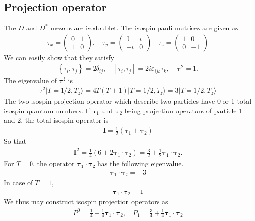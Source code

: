 \documentclass[aps,prd,preprintnumbers,showpacs,showkeys,nofootinbib,
superscriptaddress,fleqn,floatfix,tightenlines, 10pt]{revtex4-1}
\begin{document}
\subsection{Projection operator}
The $D$ and $D^*$ mesons are isodoublet. The isospin pauli matrices are given as
\begin{align}
	\tau_x = \left(\begin{array}{cc}
	0 & 1 \\
	1 & 0
	\end{array} \right), \quad
	\tau_y = \left(\begin{array}{cc}
	0 & i \\
	-i & 0
	\end{array} \right) \quad
	\tau_z = \left(\begin{array}{cc}
	1 & 0 \\
	0 & -1
	\end{array} \right)
\end{align}
We can easily show that they satisfy
\begin{align}
	\left\{ \tau_i,\tau_j \right\} = 2\delta_{ij},\quad
	\left[ \tau_i, \tau_j \right] = 2 i \varepsilon_{ijk} \tau_k,\quad
	\bm{\tau}^2 = 1.
\end{align}
The eigenvalue of $\bm{\tau}^2$ is
\begin{align}
	\tau^2 |T=1/2,T_z\rangle = 4T(T+1)|T=1/2,T_z\rangle = 3|T=1/2,T_z\rangle
\end{align}
The two isospin projection operator which describe two particles have 0 or 1 total isospin quantum numbers.
If $\bm{\tau}_1$ and $\bm{\tau}_2$ being projection operators of particle 1 and 2, the total isospin operator is
\begin{align}
	\bm{I} = \frac{1}{2} \left( \bm{\tau}_1 + \bm{\tau}_2 \right)
\end{align}
So that
\begin{align}
	\bm{I}^2 = \frac{1}{4} \left(6 + 2\bm{\tau}_1 \cdot \bm{\tau}_2 \right) = \frac{3}{2} + \frac{1}{2}\bm{\tau}_1 \cdot \bm{\tau}_2 .
\end{align}
For $T=0$, the operator $\bm{\tau}_1 \cdot \bm{\tau}_2$ has the following eigenvalue.
\begin{align}
	\bm{\tau}_1 \cdot \bm{\tau}_2 = -3
\end{align}
In case of $T=1$,
\begin{align}
	\bm{\tau}_1 \cdot \bm{\tau}_2 = 1
\end{align}
We thus may construct isospin projection operators as
\begin{align}
	P^0 = \frac{1}{4} - \frac{1}{4}\bm{\tau}_1 \cdot \bm{\tau}_2,\quad
	P_1 = \frac{3}{4} + \frac{1}{4}\bm{\tau}_1 \cdot \bm{\tau}_2
\end{align}
%
\end{document}
